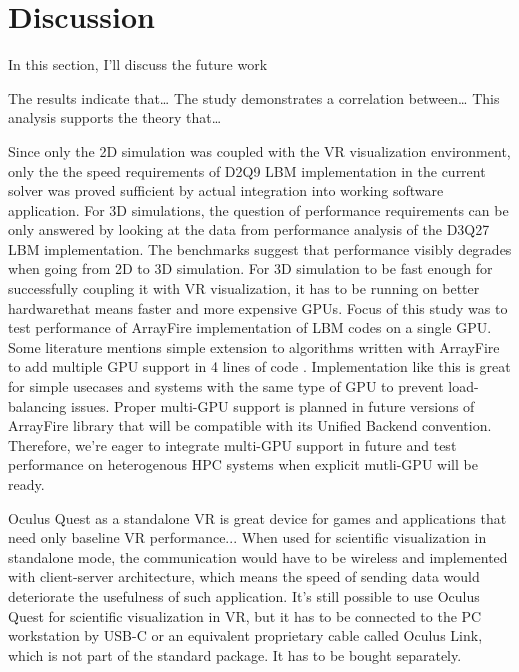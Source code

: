 \section{Discussion}\label{sec:discussion}

In this section, I'll discuss the future work 

The results indicate that…
The study demonstrates a correlation between…
This analysis supports the theory that…

Since only the 2D simulation was coupled with the VR visualization environment, only the the speed requirements of D2Q9 LBM implementation in the current solver was proved sufficient by actual integration into working software application. For 3D simulations, the question of performance requirements can be only answered by looking at the data from performance analysis of the D3Q27 LBM implementation. The benchmarks suggest that performance visibly degrades when going from 2D to 3D simulation. For 3D simulation to be fast enough for successfully coupling it with VR visualization, it has to be running on better hardware\textemdash that means faster and more expensive GPUs. Focus of this study was to test performance of ArrayFire implementation of LBM codes on a single GPU. Some literature mentions simple extension to algorithms written with ArrayFire to add multiple GPU support in 4 lines of code \citep{malcolmArrayFireGPUAcceleration2012a}. Implementation like this is great for simple usecases and systems with the same type of GPU to prevent load-balancing issues. Proper multi-GPU support is planned in future versions of ArrayFire library that will be compatible with its Unified Backend convention. Therefore, we're eager to integrate multi-GPU support in future and test performance on heterogenous HPC systems when explicit mutli-GPU will be ready.



Oculus Quest as a standalone VR is great device for games and applications that need only baseline VR performance... When used for scientific visualization in standalone mode, the communication would have to be wireless and implemented with client-server architecture, which means the speed of sending data would deteriorate the usefulness of such application. It's still possible to use Oculus Quest for scientific visualization in VR, but it has to be connected to the PC workstation by USB-C or an equivalent proprietary cable called Oculus Link, which is not part of the standard package. It has to be bought separately.

